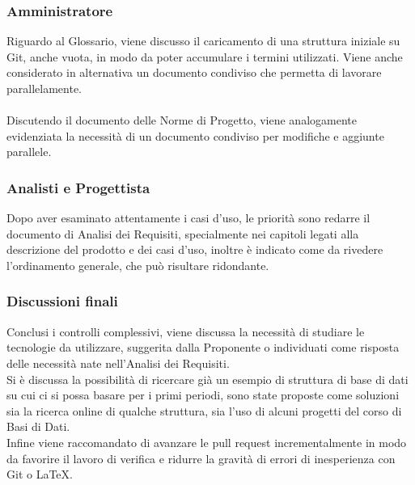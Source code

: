 \subsubsection{Amministratore}
Riguardo al Glossario, viene discusso il caricamento di una struttura iniziale su Git, anche vuota, in modo da poter accumulare i termini utilizzati. Viene anche considerato in alternativa un documento condiviso che permetta di lavorare parallelamente.\\
\\
Discutendo il documento delle Norme di Progetto, viene analogamente evidenziata la necessità di un documento condiviso per modifiche e aggiunte parallele.

\subsubsection{Analisti e Progettista}
Dopo aver esaminato attentamente i casi d'uso, le priorità sono redarre il documento di Analisi dei Requisiti, specialmente nei capitoli legati alla descrizione del prodotto e dei casi d'uso, inoltre è indicato come da rivedere l'ordinamento generale, che può risultare ridondante.

\subsubsection{Discussioni finali}
Conclusi i controlli complessivi, viene discussa la necessità di studiare le tecnologie da utilizzare, suggerita dalla Proponente o individuati come risposta delle necessità nate nell'Analisi dei Requisiti.\\
Si è discussa la possibilità di ricercare già un esempio di struttura di base di dati su cui ci si possa basare per i primi periodi, sono state proposte come soluzioni sia la ricerca online di qualche struttura, sia l'uso di alcuni progetti del corso di Basi di Dati.\\
Infine viene raccomandato di avanzare le pull request incrementalmente in modo da favorire il lavoro di verifica e ridurre la gravità di errori di inesperienza con Git o LaTeX.